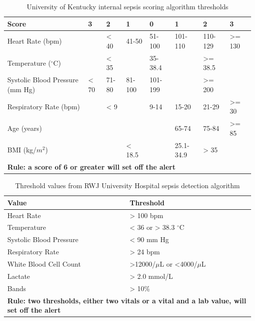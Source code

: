 \documentclass{sig-alternate}
\begin{document}
\begin{table}
\begin{center}
\renewcommand{\arraystretch}{1.5}
  \begin{tabular}{| l | l | l | l | l | l | l | l |}
\hline

{\bf Score} & {\bf 3} & {\bf 2} & {\bf 1} & {\bf 0} & {\bf 1} & {\bf 2} & {\bf 3}\\ \hline
Heart Rate (bpm) & & < 40 & 41-50 & 51-100 & 101-110 & 110-129 & >= 130\\ \hline
Temperature ($^\circ$C) & & < 35 & & 35-38.4 & & >= 38.5 &\\ \hline
Systolic Blood Pressure (mm Hg) & < 70 & 71-80 & 81-100 & 101-199 & & >= 200 & \\ \hline
Respiratory Rate (bpm) & & < 9 & & 9-14 & 15-20 & 21-29 & >= 30\\ \hline
Age (years) & & & & & 65-74 & 75-84 & >= 85\\ \hline
BMI (kg/$m^2$) & & & < 18.5 & & 25.1-34.9 & > 35 & \\ \hline
 \multicolumn{8}{|l|}{\bf Rule: a score of 6 or greater will set off the alert} \\ \hline
 \end{tabular}
	\caption{University of Kentucky internal sepsis scoring algorithm thresholds}
  \label{tab:uk_table}
\end{center}
\end{table}

\begin{table}
\renewcommand{\arraystretch}{1.5}
  \begin{tabular}{| l | l |}
\hline

{\bf Value} & {\bf Threshold}\\ \hline
Heart Rate & > 100 bpm\\ \hline
Temperature & < 36 or > 38.3 $^\circ$C\\ \hline
Systolic Blood Pressure & < 90 mm Hg\\ \hline
Respiratory Rate & > 24 bpm\\ \hline \hline
White Blood Cell Count & >12000/$\mu$L  or <4000/$\mu$L\\ \hline
Lactate & > 2.0 mmol/L\\ \hline
Bands & > 10\% \\ \hline
 \multicolumn{2}{|p{7cm}|}{\bf Rule: two thresholds, either two vitals or a vital and a lab value, will set off the alert} \\ \hline

 \end{tabular}
	\caption{Threshold values from RWJ University Hospital sepsis detection algorithm}
  \label{tab:rwj_table}
\end{table}
\end{document}
